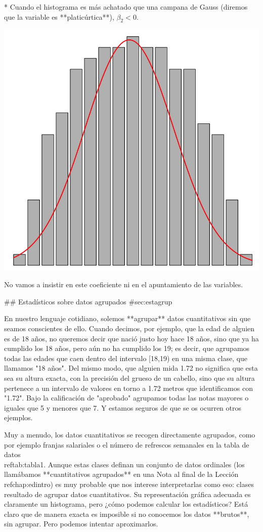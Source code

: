 \documentclass[
]{book}
\theoremstyle{definition}
\theoremstyle{definition}
\theoremstyle{definition}
\theoremstyle{definition}
\theoremstyle{remark}
\begin{document}
* Cuando el histograma es más achatado que una campana de Gauss (diremos que la variable es **platicúrtica**), $\beta_2< 0$.


\begin{center}\includegraphics[width=0.6\linewidth]{INREMDN_files/figure-html/Plati} \end{center}

No vamos a insistir en este coeficiente ni en el apuntamiento de las variables.

## Estadísticos sobre datos agrupados {#sec:estagrup}

En nuestro lenguaje cotidiano, solemos **agrupar** datos cuantitativos sin que seamos conscientes de ello. Cuando decimos, por ejemplo, que la edad de alguien es de 18 años, no queremos decir que nació justo hoy hace 18 años, sino que ya ha cumplido los 18 años, pero aún no ha cumplido los 19; es decir, que agrupamos todas las edades que caen dentro del intervalo [18,19) en una misma clase, que llamamos "18 años". Del mismo modo, que alguien mida 1.72 no significa que esta sea su altura exacta, con la precisión del grueso de un cabello, sino que su altura pertenece a un intervalo de valores en torno a 1.72 metros que identificamos con "1.72". Bajo  la calificación de "aprobado" agrupamos todas las notas mayores o iguales que 5 y menores que 7. Y estamos seguros de que se os ocurren otros ejemplos. 

Muy a menudo, los datos cuantitativos se recogen directamente agrupados, como por ejemplo franjas salariales o el número de refrescos semanales en la tabla de datos \\ref{tab:tabla1}. Aunque estas clases definan un conjunto de datos ordinales (los llamábamos **cuantitativos agrupados** en una Nota al final de la Lección \\ref{chap:edintro}) es muy probable que nos interese interpretarlas como eso: clases resultado de agrupar datos cuantitativos. Su representación gráfica adecuada es claramente un histograma, pero ¿cómo podemos calcular los estadísticos? Está claro que de manera exacta es imposible si no conocemos los datos **brutos**,  sin agrupar. Pero podemos intentar aproximarlos.
\end{document}

